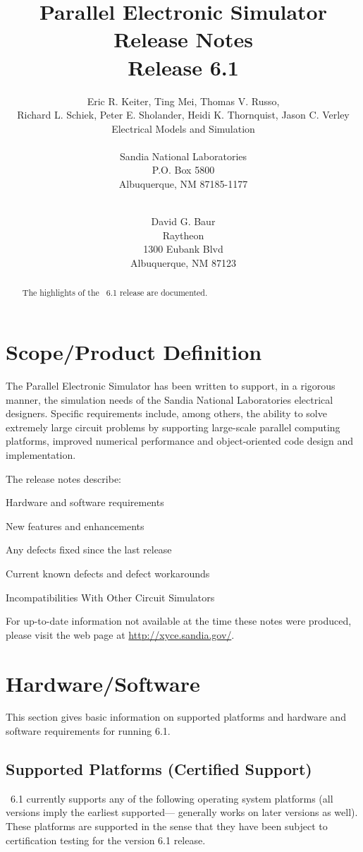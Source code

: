 \documentclass[11pt,report,strict]{SANDreport}
\title{\XyceTitle{} Parallel Electronic Simulator Release Notes\\Release 6.1}
\date{}
\author{Eric R. Keiter, 
            Ting Mei, 
            Thomas V. Russo, \\
            Richard L. Schiek, 
            Peter E. Sholander,
            Heidi K. Thornquist,
            Jason C. Verley\\
            Electrical Models and Simulation \\[1ex]
\\
            Sandia National Laboratories\\
            P.O. Box 5800\\
            Albuquerque, NM 87185-1177 \\
\\
\and 
David G. Baur\\
  Raytheon\\
  1300 Eubank Blvd\\
  Albuquerque, NM 87123 \\
}
\begin{document}
\maketitle
\begin{abstract}
  The highlights of the \XyceTM\ 6.1 release are documented.
\end{abstract}
\cleardoublepage
\tableofcontents


%
\SANDmain		%
\section{Scope/Product Definition}

The \Xyce{} Parallel Electronic Simulator has been written to support, in a
rigorous manner, the simulation needs of the Sandia National Laboratories
electrical designers.  Specific requirements include, among others, the
ability to solve extremely large circuit problems by supporting large-scale
parallel computing platforms, improved numerical performance and
object-oriented code design and implementation.

The \Xyce{} release notes describe:
\begin{XyceItemize}
  \item Hardware and software requirements
  \item New features and enhancements
  \item Any defects fixed since the last release
  \item Current known defects and defect workarounds
  \item Incompatibilities With Other Circuit Simulators
\end{XyceItemize}

For up-to-date information not available at the time these notes 
were produced, please visit the \Xyce{} web page at 
{\color{XyceDeepRed}\url{http://xyce.sandia.gov/}}.


\section{Hardware/Software}
This section gives basic information on supported platforms and hardware
and software requirements for running \Xyce{} 6.1.

\subsection{Supported Platforms (Certified Support)}
\Xyce\ 6.1 currently supports any of the following operating system platforms
(all versions imply the earliest supported---\Xyce{} generally works on later
versions as well).  These platforms are supported in the sense that they have
been subject to certification testing for the \Xyce{} version 6.1 release.  
\end{document}
